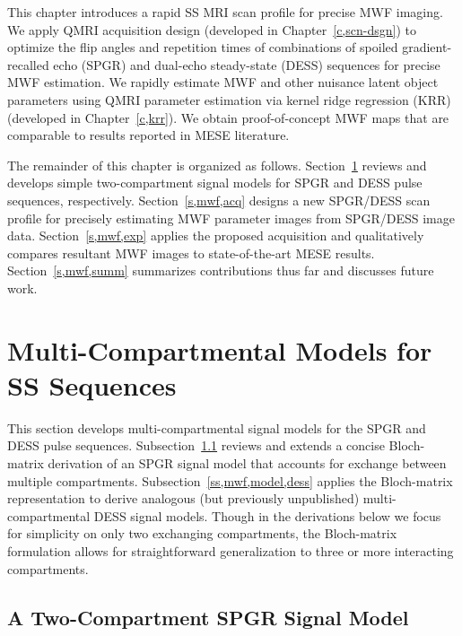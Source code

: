 This chapter introduces
a rapid SS MRI scan profile
for precise MWF imaging.
We apply QMRI acquisition design
(developed in Chapter~\ref{c,scn-dsgn})
to optimize the flip angles and repetition times
of combinations 
of spoiled gradient-recalled echo (SPGR)
\cite{zur:91:sot}
and dual-echo steady-state (DESS) 
\cite{redpath:88:fan, bruder:88:ans} sequences
for precise MWF estimation.
We rapidly estimate MWF and 
other nuisance latent object parameters
using QMRI parameter estimation
via kernel ridge regression (KRR)
(developed in Chapter~\ref{c,krr}).
We obtain proof-of-concept MWF maps \invivo
that are comparable
to results reported
in MESE literature.

The remainder of this chapter
is organized as follows.
Section~\ref{s,mwf,model} reviews and develops
simple two-compartment signal models
for SPGR and DESS pulse sequences, 
respectively.
Section~\ref{s,mwf,acq} designs 
a new SPGR/DESS scan profile 
for precisely estimating MWF parameter images
from SPGR/DESS image data.
Section~\ref{s,mwf,exp} applies
the proposed acquisition \invivo
and qualitatively compares resultant MWF images
to state-of-the-art MESE results.
Section~\ref{s,mwf,summ} summarizes contributions thus far
and discusses future work. 

\section{Multi-Compartmental Models for SS Sequences}
\label{s,mwf,model}

This section develops multi-compartmental signal models
for the SPGR and DESS pulse sequences.
Subsection~\ref{ss,mwf,model,spgr} reviews and extends
a concise Bloch-matrix derivation \cite{spencer:00:mos}
of an SPGR signal model 
that accounts for exchange 
between multiple compartments.
Subsection~\ref{ss,mwf,model,dess} applies 
the Bloch-matrix representation
to derive analogous 
(but previously unpublished)
multi-compartmental DESS signal models. 
Though in the derivations below
we focus for simplicity
on only two exchanging compartments,
the Bloch-matrix formulation allows
for straightforward generalization
to three or more interacting compartments.

\subsection{A Two-Compartment SPGR Signal Model}
\label{ss,mwf,model,spgr}


